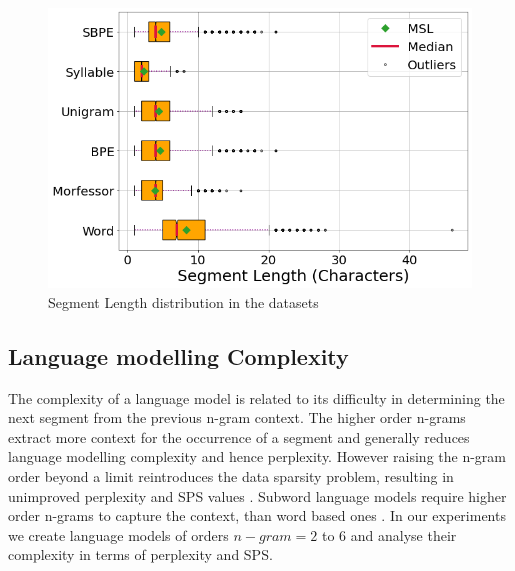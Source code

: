 \begin{figure}[htpb]
    \centering
    \includegraphics[width=0.85\linewidth]{segmentlength.png}
    \caption{Segment Length distribution in the datasets}
    \label{fig:segmentlength}
\end{figure}


\subsection{Language modelling Complexity}

The complexity of a language model is related to its difficulty in determining
the next segment from the previous n-gram context. The higher order n-grams
extract more context for the occurrence of a segment and generally reduces
language modelling complexity and hence perplexity. However raising the n-gram
order beyond a limit reintroduces the data sparsity problem, resulting in
unimproved perplexity and SPS values \cite{Mousa1995}. Subword language models
require higher order n-grams to capture the context, than word based ones
\cite{pilar2022subword}. In our experiments we create language models of orders
$n-gram=2$ to $6$ and analyse their complexity in terms of perplexity and SPS.

